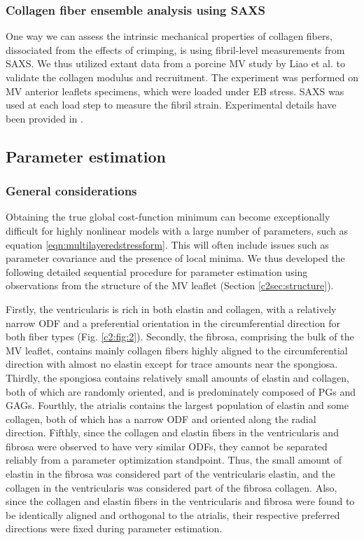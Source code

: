     
\subsubsection{Collagen fiber ensemble analysis using SAXS}

    One way we can assess the intrinsic mechanical properties of collagen fibers, dissociated from the effects of crimping, is using fibril-level measurements from SAXS. We thus utilized extant data from a porcine MV study by Liao et al. \cite{liao_relation_2007} to validate the collagen modulus and recruitment. The experiment was performed on MV anterior leaflets specimens, which were loaded under EB stress. SAXS was used at each load step to measure the fibril strain. Experimental details have been provided in \cite{liao_relation_2007}.
    



\subsection{Parameter estimation}

\subsubsection{General considerations}

    Obtaining the true global cost-function minimum can become exceptionally difficult for highly nonlinear models with a large number of parameters, such as equation \ref{eqn:multilayeredstressform}. This will often include issues such as parameter covariance and the presence of local minima. We thus developed the following detailed sequential procedure for parameter estimation using observations from the structure of the MV leaflet (Section \ref{c2sec:structure}).
    
    
    Firstly, the ventricularis is rich in both elastin and collagen, with a relatively narrow ODF and a preferential orientation in the circumferential direction for both fiber types (Fig. \ref{c2:fig:2}). Secondly, the fibrosa, comprising the bulk of the MV leaflet, contains mainly collagen fibers highly aligned to the circumferential direction with almost no elastin except for trace amounts near the spongiosa. Thirdly, the spongiosa contains relatively small amounts of elastin and collagen, both of which are randomly oriented, and is predominately composed of PGs and GAGs. Fourthly, the atrialis contains the largest population of elastin and some collagen, both of which has a narrow ODF and oriented along the radial direction. Fifthly, since the collagen and elastin fibers in the ventricularis and fibrosa were observed to have very similar ODFs, they cannot be separated reliably from a parameter optimization standpoint. Thus, the small amount of elastin in the fibrosa was considered part of the ventricularis elastin, and the collagen in the ventricularis was considered part of the fibrosa collagen. Also, since the collagen and elastin fibers in the ventricularis and fibrosa were found to be identically aligned and orthogonal to the atrialis, their respective preferred directions were fixed during parameter estimation.
    
